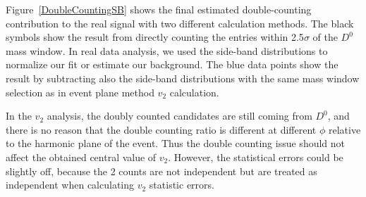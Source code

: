 \documentclass[a4paper]{article}
\begin{document}
Figure~\ref{DoubleCountingSB} shows the final estimated double-counting contribution to the real signal with two different calculation methods. The black symbols show the result from directly counting the entries within 2.5$\sigma$ of the $D^0$ mass window. In real data analysis, we used the side-band distributions to normalize our fit or estimate our background. The blue data points show the result by subtracting also the side-band distributions with the same mass window selection as in event plane method $v_2$ calculation. 

\begin{figure}
\end{figure}

In the $v_2$ analysis, the doubly counted candidates are still coming from $D^0$, and there is no reason that the double counting ratio is different at different $\phi$ relative to the harmonic plane of the event. Thus the double counting issue should not affect the obtained central value of $v_2$. However, the statistical errors could be slightly off, because the 2 counts are not independent but are treated as independent when calculating $v_2$ statistic errors.
\end{document}
